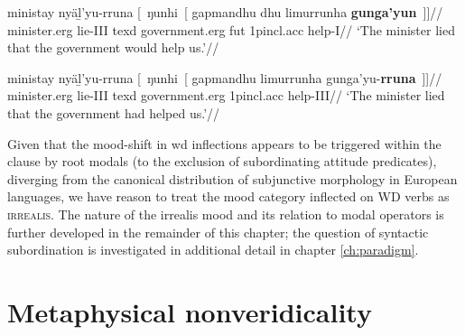 \a\begingl\gla ministay nyäḻ'yu-rruna \textup[~ŋunhi~\textup[ gapmandhu dhu limurrunha \textbf{gunga'yun}\textup{~]]}//
\glb minister.\gls{erg} lie-\gls{III} \gls{texd} government.\gls{erg} \gls{fut} 1p\gls{incl}.\gls{acc} help-\gls{I}//
\glft`The minister lied that the government would help us.'\trailingcitation{[DhG~20190417]}//\endgl

\a\begingl\gla ministay nyäḻ'yu-rruna \textup[~ŋunhi~\textup[ gapmandhu limurrunha gunga'yu-\textbf{rruna}\textup{~]]}//
\glb minister.\gls{erg} lie-\gls{III} \gls{texd} government.\gls{erg} 1p\gls{incl}.\gls{acc} help-\gls{III}//
\glft`The minister lied that the government had helped us.'\trailingcitation{[DhG~20190417]}//\endgl
\xe

Given that the mood-shift in \gls{wd} inflections appears to be triggered within the clause by root modals (to the exclusion of subordinating attitude predicates), diverging from the canonical distribution of subjunctive morphology in European languages, we have reason \citep[following][]{Palmer2001} to treat the mood category inflected on WD verbs as \textsc{irrealis}. The nature of the irrealis mood and its relation to modal operators is further developed in the remainder of this chapter; the question of syntactic subordination is investigated in additional detail in chapter \ref{ch:paradigm}.

\section{Metaphysical nonveridicality}



